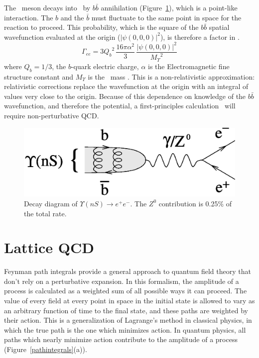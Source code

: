 \documentclass{cornell}
\begin{document}
The \ups\ meson decays into \ee\ by $b\bar{b}$ annihilation
(Figure~\ref{diagramgee}), which is a point-like interaction.  The $b$
and the $\bar{b}$ must fluctuate to the same point in space for the
reaction to proceed.  This probability, which is the square of the
$b\bar{b}$ spatial wavefunction evaluated at the origin
($|\psi(0,0,0)|^2$), is therefore a factor in \gee.
\begin{equation}
  \Gamma_{ee} = 3 {Q_b}^2 \, \frac{16 \pi \alpha^2}{3} \, \frac{|\psi(0,0,0)|^2}{{M_\Upsilon}^2}
  \label{eqn:waveatorigin}
\end{equation}
where $Q_b=1/3$, the $b$-quark electric charge, $\alpha$ is the
Electromagnetic fine structure constant and $M_\Upsilon$ is the \ups\
mass \cite{ps}.  This is a non-relativistic approximation:
relativistic corrections replace the wavefunction at the origin with
an integral of values very close to the origin.  Because of this
dependence on knowledge of the $b\bar{b}$ wavefunction, and therefore
the potential, a first-principles calculation \gee\ will require
non-perturbative QCD.

\begin{figure}[p]
  \begin{center}
    \includegraphics[width=0.5\linewidth]{diagramgee}
  \end{center}
  \caption[Decay diagram of $\Upsilon(nS) \to e^+e^-$]{\label{diagramgee}
  Decay diagram of $\Upsilon(nS) \to e^+e^-$.  The $Z^0$ contribution is
  0.25\% of the total rate.}
\end{figure}

\section{Lattice QCD}

Feynman path integrals provide a general approach to quantum field
theory that don't rely on a perturbative expansion.  In this
formalism, the amplitude of a process is calculated as a weighted sum
of all possible ways it can proceed.  The value of every field at
every point in space in the initial state is allowed to vary as an
arbitrary function of time to the final state, and these paths are
weighted by their action.  This is a generalization of Lagrange's
method in classical physics, in which the true path is the one which
minimizes action.  In quantum physics, all paths which nearly minimize
action contribute to the amplitude of a process (Figure~\ref{pathintegrals}(a)).
\end{document}
